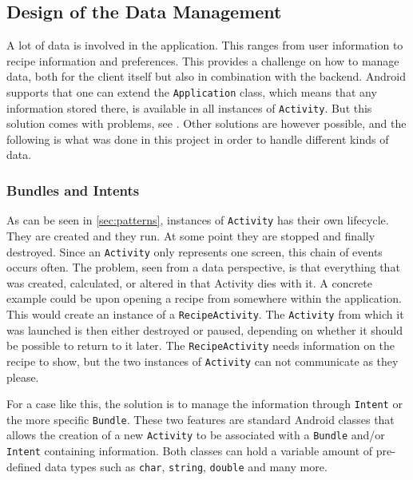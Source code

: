 \subsection{Design of the Data Management}
\label{subsec:designdatamanagement}

A lot of data is involved in the application. This ranges from user information to recipe information and preferences. This provides a challenge on how to manage data, both for the client itself but also in combination with the backend. Android supports that one can extend the \texttt{Application} class, which means that any information stored there, is available in all instances of \texttt{Activity}. But this solution comes with problems, see \citep{application_storage}. Other solutions are however possible, and the following is what was done in this project in order to handle different kinds of data.

\subsubsection{Bundles and Intents}
\label{subsubsec:bundles_and_intents}

As can be seen in \ref{sec:patterns}, instances of \texttt{Activity} has their own lifecycle. They are created and they run. At some point they are stopped and finally destroyed. Since an \texttt{Activity} only represents one screen, this chain of events occurs often. The problem, seen from a data perspective, is that everything that was created, calculated, or altered in that Activity dies with it.
A concrete example could be upon opening a recipe from somewhere within the application. This would create an instance of a \texttt{RecipeActivity}. The \texttt{Activity} from which it was launched is then either destroyed or paused, depending on whether it should be possible to return to it later. The \texttt{RecipeActivity} needs information on the recipe to show, but the two instances of \texttt{Activity} can not communicate as they please.

For a case like this, the solution is to manage the information through \texttt{Intent} or the more specific \texttt{Bundle}. These two features are standard Android classes that allows the creation of a new \texttt{Activity} to be associated with a \texttt{Bundle} and/or \texttt{Intent} containing information\cite{intent}\cite{bundle}. Both classes can hold a variable amount of pre-defined data types such as \texttt{char}, \texttt{string}, \texttt{double} and many more.

